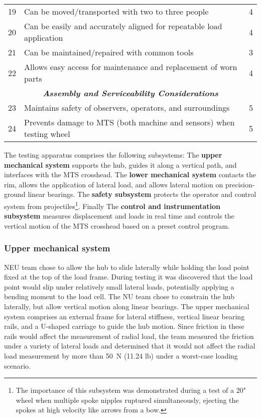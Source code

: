 \documentclass[\rootdir/thesis.tex]{subfiles}
\begin{document}
\begin{table}
\begin{tabularx}{\linewidth}{r|Xc}
\hline
19& Can be moved/transported with two to three people& 4\\
20& Can be easily and accurately aligned for repeatable load application& 4\\
21& Can be maintained/repaired with common tools& 3\\
22& Allows easy access for maintenance and replacement of worn parts& 4\\
\hline
\multicolumn{3}{c}{\emph{\textbf{Assembly and Serviceability Considerations}}}\\
\hline
23& Maintains safety of observers, operators, and surroundings& 5\\
24& Prevents damage to MTS (both machine and sensors) when testing wheel& 5\\
\hline
\end{tabularx}
\end{table}

The testing apparatus comprises the following subsystems: The \textbf{upper mechanical system} supports the hub, guides it along a vertical path, and interfaces with the MTS crosshead. The \textbf{lower mechanical system} contacts the rim, allows the application of lateral load, and allows lateral motion on precision-ground linear bearings. The \textbf{safety subsystem} protects the operator and control system from projectiles\footnote{The importance of this subsystem was demonstrated during a test of a 20" wheel when multiple spoke nipples ruptured simultaneously, ejecting the spokes at high velocity like arrows from a bow.}. Finally The \textbf{control and instrumentation subsystem} measures displacement and loads in real time and controls the vertical motion of the MTS crosshead based on a preset control program.

\subsubsection{Upper mechanical system}

NEU team chose to allow the hub to slide laterally while holding the load point fixed at the top of the load frame. During testing it was discovered that the load point would slip under relatively small lateral loads, potentially applying a bending moment to the load cell. The NU team chose to constrain the hub laterally, but allow vertical motion along linear bearings. The upper mechanical system comprises an external frame for lateral stiffness, vertical linear bearing rails, and a U-shaped carriage to guide the hub motion. Since friction in these rails would affect the measurement of radial load, the team measured the friction under a variety of lateral loads and determined that it would not affect the radial load measurement by more than \SI{50}{\newton} (11.24 lb) under a worst-case loading scenario.
\end{document}
